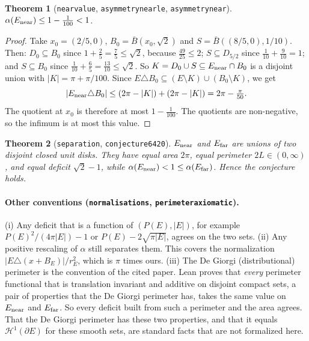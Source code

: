 \documentclass[11pt]{article}
\newtheorem{theorem}{Theorem}
\theoremstyle{definition}
\theoremstyle{remark}
\renewcommand{\_}{\oldus\allowbreak}
\newcommand{\Hm}{\mathcal{H}^1}
\begin{document}
\begin{theorem}[\texttt{near\_value}, \texttt{asymmetry\_near\_le}, \texttt{asymmetry\_near}]
$\alpha(E_{\rm near})\le 1-\tfrac1{100}<1$.
\end{theorem}
\begin{proof}
Take $x_0=(2/5,0)$, $B_0=\bar B(x_0,\sqrt2)$ and $S=\bar B((8/5,0),1/10)$. Then:
$D_0\subseteq B_0$ since $1+\tfrac25=\tfrac75\le\sqrt2$, because $\tfrac{49}{25}\le2$;
$S\subseteq D_{5/2}$ since $\tfrac1{10}+\tfrac9{10}=1$;
and $S\subseteq B_0$ since $\tfrac1{10}+\tfrac65=\tfrac{13}{10}\le\sqrt2$.
So $K=D_0\cup S\subseteq E_{\rm near}\cap B_0$ is a disjoint union with
$|K|=\pi+\pi/100$. Since $E\triangle B_0\subseteq (E\setminus K)\cup(B_0\setminus K)$, we get
\[
|E_{\rm near}\triangle B_0|\le (2\pi-|K|)+(2\pi-|K|)=2\pi-\tfrac{\pi}{50}.
\]
The quotient at $x_0$ is therefore at most $1-\tfrac1{100}$. The quotients are non-negative, so the
infimum is at most this value.
\end{proof}

\begin{theorem}[\texttt{separation}, \texttt{conjecture6420}]
$E_{\rm near}$ and $E_{\rm far}$ are unions of two disjoint closed unit disks. They have equal
area $2\pi$, equal perimeter $2L\in(0,\infty)$, and equal deficit $\sqrt2-1$, while
$\alpha(E_{\rm near})<1\le\alpha(E_{\rm far})$. Hence the conjecture holds.
\end{theorem}

\paragraph{Other conventions (\texttt{normalisations}, \texttt{perimeter\_axiomatic}).}
(i) Any deficit that is a function of $(P(E),|E|)$, for example $P(E)^2/(4\pi|E|)-1$ or
$P(E)-2\sqrt{\pi|E|}$, agrees on the two sets. (ii) Any positive rescaling of $\alpha$ still
separates them. This covers the normalization $|E\triangle(x+B_E)|/r_E^{2}$, which is $\pi$ times
ours. (iii) The De Giorgi (distributional) perimeter is the convention of the cited paper. Lean
proves that \emph{every} perimeter functional that is translation invariant and additive on
disjoint compact sets, a pair of properties that the De Giorgi perimeter has, takes the same value
on $E_{\rm near}$ and $E_{\rm far}$. So every deficit built from such a perimeter and the area
agrees. That the De Giorgi perimeter has these two properties, and that it equals $\Hm(\partial E)$
for these smooth sets, are standard facts that are not formalized here.
\end{document}
